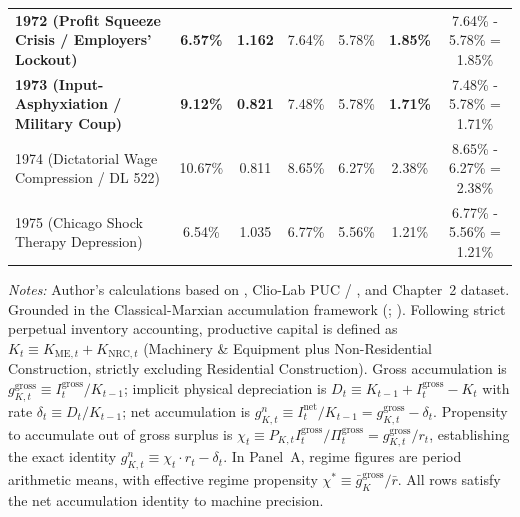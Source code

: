 \begin{table}[htbp]
{\begin{tabular}{lcccccc}
\textbf{1972 (Profit Squeeze Crisis / Employers' Lockout)} & \textbf{6.57\%} & \textbf{1.162} & 7.64\% & 5.78\% & \textbf{1.85\%} & 7.64\% - 5.78\% = 1.85\% \\
\textbf{1973 (Input-Asphyxiation / Military Coup)} & \textbf{9.12\%} & \textbf{0.821} & 7.48\% & 5.78\% & \textbf{1.71\%} & 7.48\% - 5.78\% = 1.71\% \\
1974 (Dictatorial Wage Compression / DL 522) & 10.67\% & 0.811 & 8.65\% & 6.27\% & 2.38\% & 8.65\% - 6.27\% = 2.38\% \\
1975 (Chicago Shock Therapy Depression) & 6.54\% & 1.035 & 6.77\% & 5.56\% & 1.21\% & 6.77\% - 5.56\% = 1.21\% \\
\bottomrule
\end{tabular}%
}
\begin{minipage}{0.98\textwidth}
\vspace{0.4em}
\footnotesize
\textit{Notes:} Author's calculations based on \citet{Astorga2023}, Clio-Lab PUC / \citet{DiazLudersWagner2016}, and Chapter~2 dataset. Grounded in the Classical-Marxian accumulation framework (\citealt{Weisskopf1978,Weisskopf1979}; \citealt[Section 6.1]{Basu2017}). Following strict perpetual inventory accounting, productive capital is defined as $K_t \equiv K_{\text{ME}, t} + K_{\text{NRC}, t}$ (Machinery \& Equipment plus Non-Residential Construction, strictly excluding Residential Construction). Gross accumulation is $g^{\text{gross}}_{K, t} \equiv I^{\text{gross}}_t / K_{t-1}$; implicit physical depreciation is $D_t \equiv K_{t-1} + I^{\text{gross}}_t - K_t$ with rate $\delta_t \equiv D_t / K_{t-1}$; net accumulation is $g^n_{K, t} \equiv I^{\text{net}}_t / K_{t-1} = g^{\text{gross}}_{K, t} - \delta_t$. Propensity to accumulate out of gross surplus is $\chi_t \equiv P_{K, t} I^{\text{gross}}_t / \Pi^{\text{gross}}_t = g^{\text{gross}}_{K, t} / r_t$, establishing the exact identity $g^n_{K, t} \equiv \chi_t \cdot r_t - \delta_t$. In Panel~A, regime figures are period arithmetic means, with effective regime propensity $\chi^* \equiv \bar{g}^{\text{gross}}_K / \bar{r}$. All rows satisfy the net accumulation identity to machine precision.
\end{minipage}
\end{table}
